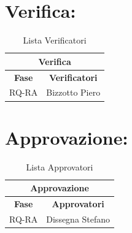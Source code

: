 \section*{\LARGE Verifica:}
\begin{table}[!h]
	\begin{center}
		\begin{tabular}
			{|c|c|}
			\hline
			\multicolumn{2}{|c|}{ \textbf{Verifica} } \\
			\hline
			\textbf{Fase} & \textbf{Verificatori} \\
			\hline
			\multirow{1}{*}{RQ-RA} &  Bizzotto Piero \\
				\hline
		\end{tabular}
		\caption{Lista Verificatori} %
		\label{tabverifica}
	\end{center}
\end{table}

\newpage
  
\section*{\LARGE Approvazione:}
\begin{table}[!h]
  \begin{center}
    \begin{tabular}
      {|c|c|}
      \hline
      \multicolumn{2}{|c|}{ \textbf{Approvazione} } \\
      \hline
      \textbf{Fase} & \textbf{Approvatori} \\
      \hline
      \multirow{1}{*}{RQ-RA} & Dissegna Stefano \\
                  
      \hline
    \end{tabular}
    \caption{Lista Approvatori} %
    \label{tabapprovazione}
  \end{center}
\end{table}
 
